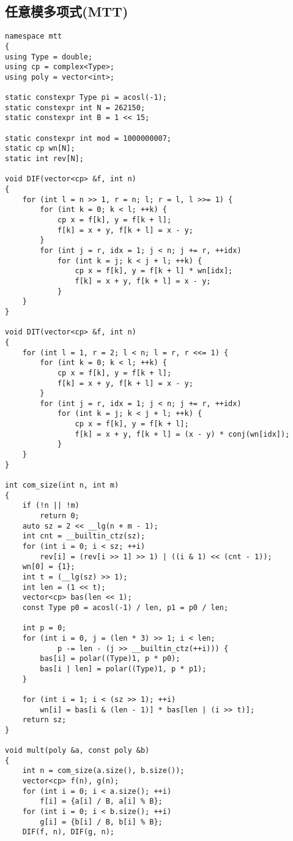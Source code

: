 \documentclass[twocolumn,a4]{article}
\begin{document}
\subsection{任意模多项式(MTT)}
\begin{lstlisting}
namespace mtt
{
using Type = double;
using cp = complex<Type>;
using poly = vector<int>;

static constexpr Type pi = acosl(-1);
static constexpr int N = 262150;
static constexpr int B = 1 << 15;

static constexpr int mod = 1000000007;
static cp wn[N];
static int rev[N];

void DIF(vector<cp> &f, int n)
{
    for (int l = n >> 1, r = n; l; r = l, l >>= 1) {
        for (int k = 0; k < l; ++k) {
            cp x = f[k], y = f[k + l];
            f[k] = x + y, f[k + l] = x - y;
        }
        for (int j = r, idx = 1; j < n; j += r, ++idx)
            for (int k = j; k < j + l; ++k) {
                cp x = f[k], y = f[k + l] * wn[idx];
                f[k] = x + y, f[k + l] = x - y;
            }
    }
}

void DIT(vector<cp> &f, int n)
{
    for (int l = 1, r = 2; l < n; l = r, r <<= 1) {
        for (int k = 0; k < l; ++k) {
            cp x = f[k], y = f[k + l];
            f[k] = x + y, f[k + l] = x - y;
        }
        for (int j = r, idx = 1; j < n; j += r, ++idx)
            for (int k = j; k < j + l; ++k) {
                cp x = f[k], y = f[k + l];
                f[k] = x + y, f[k + l] = (x - y) * conj(wn[idx]);
            }
    }
}

int com_size(int n, int m)
{
    if (!n || !m)
        return 0;
    auto sz = 2 << __lg(n + m - 1);
    int cnt = __builtin_ctz(sz);
    for (int i = 0; i < sz; ++i)
        rev[i] = (rev[i >> 1] >> 1) | ((i & 1) << (cnt - 1));
    wn[0] = {1};
    int t = (__lg(sz) >> 1);
    int len = (1 << t);
    vector<cp> bas(len << 1);
    const Type p0 = acosl(-1) / len, p1 = p0 / len;

    int p = 0;
    for (int i = 0, j = (len * 3) >> 1; i < len;
            p -= len - (j >> __builtin_ctz(++i))) {
        bas[i] = polar((Type)1, p * p0);
        bas[i | len] = polar((Type)1, p * p1);
    }

    for (int i = 1; i < (sz >> 1); ++i)
        wn[i] = bas[i & (len - 1)] * bas[len | (i >> t)];
    return sz;
}

void mult(poly &a, const poly &b)
{
    int n = com_size(a.size(), b.size());
    vector<cp> f(n), g(n);
    for (int i = 0; i < a.size(); ++i)
        f[i] = {a[i] / B, a[i] % B};
    for (int i = 0; i < b.size(); ++i)
        g[i] = {b[i] / B, b[i] % B};
    DIF(f, n), DIF(g, n);


\end{lstlisting}
\end{document}

